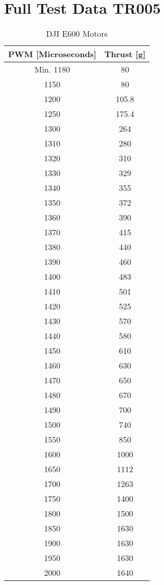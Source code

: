 \section{Full Test Data TR005}
\label{app:tr005}

\begin {table}[H]
    \begin{center}
    \caption {DJI E600 Motors} 
    \label{tab:tabt1} 
    \begin{tabular}{|c|c|}\hline 
\textbf{PWM [Microseconds]} & \textbf{Thrust [g]}\\
\hline 
Min. 1180 & 80 \\
1150 & 80 \\
1200 & 105.8 \\
1250 & 175.4 \\
1300 & 264 \\
1310 & 280 \\
1320 & 310 \\
1330 & 329 \\
1340 & 355 \\
1350 & 372 \\
1360 & 390 \\
1370 & 415 \\
1380 & 440 \\
1390 & 460 \\
1400 & 483 \\
1410 & 501 \\
1420 & 525 \\
1430 & 570 \\
1440 & 580 \\
1450 & 610 \\
1460 & 630 \\
1470 & 650 \\
1480 & 670 \\
1490 & 700 \\
1500 & 740 \\
1550 & 850 \\
1600 & 1000 \\
1650 & 1112 \\
1700 & 1263 \\
1750 & 1400 \\
1800 & 1500 \\
1850 & 1630 \\
1900 & 1630 \\
1950 & 1630 \\
2000 & 1640 \\

        \hline 
    \end{tabular}
    \end{center}
\end{table}
